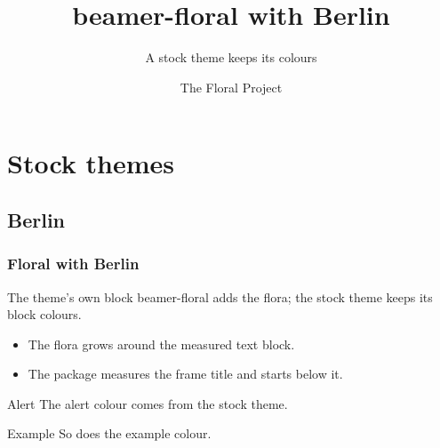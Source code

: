 \documentclass[aspectratio=169]{beamer}
\title{beamer-floral with Berlin}
\subtitle{A stock theme keeps its colours}
\author{The Floral Project}
\institute{beamer-floral}
\date{}
\begin{document}
\begin{frame}[plain]\titlepage\end{frame}
\section{Stock themes}\subsection{Berlin}
\begin{frame}
  \frametitle{Floral with Berlin}
  \begin{block}{The theme's own block}
    beamer-floral adds the flora; the stock theme keeps its block colours.
  \end{block}
  \begin{itemize}
    \item The flora grows around the measured text block.
    \item The package measures the frame title and starts below it.
  \end{itemize}
  \begin{alertblock}{Alert}
    The alert colour comes from the stock theme.
  \end{alertblock}
  \begin{exampleblock}{Example}
    So does the example colour.
  \end{exampleblock}
\end{frame}
\end{document}
